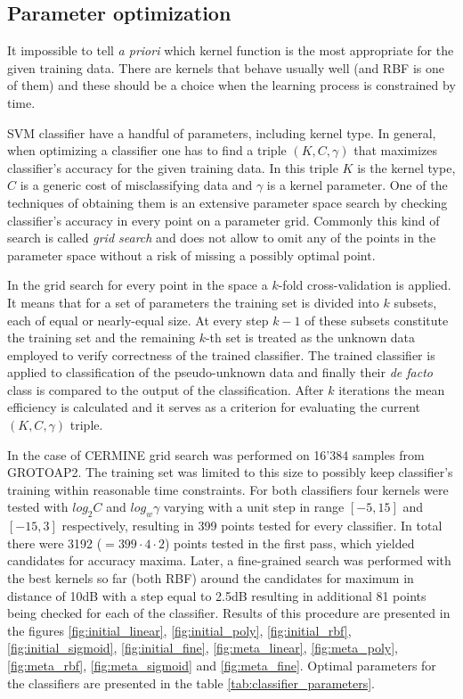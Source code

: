 \subsection{Parameter optimization}
\label{sec:svm_optimization}
It impossible to tell \textit{a priori} which kernel function is the most appropriate for the given training data. There are kernels that behave usually well (and RBF is one of them) and these should be a choice when the learning process is constrained by time.

SVM classifier have a handful of parameters, including kernel type. In general, when optimizing a classifier one has to find a triple $(K, C, \gamma)$ that maximizes classifier's accuracy for the given training data. In this triple $K$ is the kernel type, $C$ is a generic cost of misclassifying data and $\gamma$ is a kernel parameter. One of the techniques of obtaining them is an extensive parameter space search by checking classifier's accuracy in every point on a parameter grid. Commonly this kind of search is called \textit{grid search} and does not allow to omit any of the points in the parameter space without a risk of missing a possibly optimal point.

In the grid search for every point in the space a $k$-fold cross-validation is applied. It means that for a set of parameters the training set is divided into $k$ subsets, each of equal or nearly-equal size. At every step $k-1$ of these subsets constitute the training set and the remaining $k$-th set is treated as the unknown data employed to verify correctness of the trained classifier. The trained classifier is applied to classification of the pseudo-unknown data and finally their \textit{de facto} class is compared to the output of the classification. After $k$ iterations the mean efficiency is calculated and it serves as a criterion for evaluating the current $(K, C, \gamma)$ triple.


In the case of CERMINE grid search was performed on 16'384 samples from GROTOAP2. The training set was limited to this size to possibly keep classifier's training within reasonable time constraints. For both classifiers four kernels were tested with $log_{2}C$ and $log_{w}\gamma$ varying with a unit step in range $[-5,15]$ and $[-15,3]$ respectively, resulting in 399 points tested for every classifier. In total there were 3192 ($=399\cdot4\cdot2$) points tested in the first pass, which yielded candidates for accuracy maxima. Later, a fine-grained search was performed with the best kernels so far (both RBF) around the candidates for maximum in distance of 10dB with a step equal to 2.5dB resulting in additional 81 points being checked for each of the classifier. Results of this procedure are presented in the figures \ref{fig:initial_linear}, \ref{fig:initial_poly}, \ref{fig:initial_rbf}, \ref{fig:initial_sigmoid}, \ref{fig:initial_fine}, \ref{fig:meta_linear}, \ref{fig:meta_poly}, \ref{fig:meta_rbf}, \ref{fig:meta_sigmoid} and \ref{fig:meta_fine}. Optimal parameters for the classifiers are presented in the table \ref{tab:classifier_parameters}.


